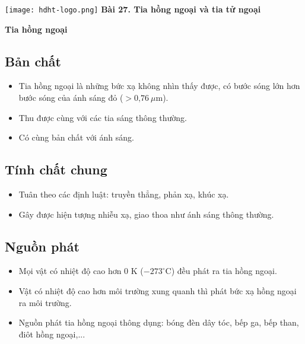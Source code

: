 \newcommand{\chapter}[2][]{
	\newcommand{\chapname}{#2}
	\begin{flushleft}
		\begin{minipage}[t]{\linewidth}
			\texttt{[image: hdht-logo.png]}
			\hspace{0pt}	
			\sffamily\bfseries\large Bài  27. Tia hồng ngoại và tia tử ngoại
			\begin{flushleft}
				\huge\bfseries #1
			\end{flushleft}
		\end{minipage}
	\end{flushleft}
	\vspace{1cm}
	\normalfont\normalsize
}
\chapter[Tia hồng ngoại]{Tia hồng ngoại}

\subsection {Bản chất}
\begin{itemize}
	\item Tia hồng ngoại là những bức xạ không nhìn thấy được, có bước sóng lớn hơn bước sóng của ánh sáng đỏ ($> \text{0,76}\ \mu \text{m}$). 
	\item Thu được cùng với các tia sáng thông thường.
	\item Có cùng bản chất với ánh sáng.
\end{itemize}

\subsection{Tính chất chung}
\begin{itemize}
	\item Tuân theo các định luật: truyền thẳng, phản xạ, khúc xạ.
	\item Gây được hiện tượng nhiễu xạ, giao thoa như ánh sáng thông thường. 
\end{itemize}

\subsection{Nguồn phát}
\begin{itemize}
	\item Mọi vật có nhiệt độ cao hơn 0 K ($-273^\circ \text{C}$) đều phát ra tia hồng ngoại.
	\item Vật có nhiệt độ cao hơn môi trường xung quanh thì phát bức xạ hồng ngoại ra môi trường.
	\item Nguồn phát tia hồng ngoại thông dụng: bóng đèn dây tóc, bếp ga, bếp than, điôt hồng ngoại,...
\end{itemize}

